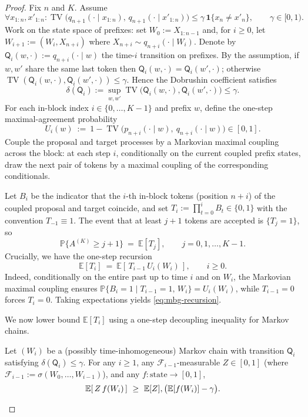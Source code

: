 \begin{proof}
Fix $n$ and $K$. Assume
\[
\forall x_{1:n},x'_{1:n}:\operatorname{TV}\big(q_{n+1}(\cdot\mid x_{1:n}),\,q_{n+1}(\cdot\mid x'_{1:n})\big)\le \gamma\,\mathbf{1}\{x_n\ne x'_n\},\qquad \gamma\in[0,1).
\]
Work on the state space of prefixes: set $W_0:=X_{1:n-1}$ and, for $i\ge0$, let $W_{i+1}:=(W_i,X_{n+i})$ where $X_{n+i}\sim q_{n+i}(\cdot\mid W_i)$. Denote by $\mathsf Q_i(w,\cdot):=q_{n+i}(\cdot\mid w)$ the time-$i$ transition on prefixes. By the assumption, if $w,w'$ share the same last token then $\mathsf Q_i(w,\cdot)=\mathsf Q_i(w',\cdot)$; otherwise $\operatorname{TV}(\mathsf Q_i(w,\cdot),\mathsf Q_i(w',\cdot))\le\gamma$. Hence the Dobrushin coefficient satisfies
\[
\delta(\mathsf Q_i):=\sup_{w,w'}\operatorname{TV}\big(\mathsf Q_i(w,\cdot),\mathsf Q_i(w',\cdot)\big)\le\gamma.
\]
For each in-block index $i\in\{0,\dots,K-1\}$ and prefix $w$, define the one-step maximal-agreement probability
\[
U_i(w)\ :=\ 1-\operatorname{TV}\big(p_{n+i}(\cdot\mid w),\ q_{n+i}(\cdot\mid w)\big)\in[0,1].
\]
Couple the proposal and target processes by a Markovian maximal coupling across the block: at each step $i$, conditionally on the current coupled prefix states, draw the next pair of tokens by a maximal coupling of the corresponding conditionals.

Let $B_i$ be the indicator that the $i$-th in-block tokens (position $n+i$) of the coupled proposal and target coincide, and set $T_i:=\prod_{t=0}^{i} B_t\in\{0,1\}$ with the convention $T_{-1}\equiv 1$. The event that at least $j{+}1$ tokens are accepted is $\{T_j=1\}$, so
\[
\mathbb{P}\{A^{(K)}\ge j{+}1\}\ =\ \mathbb{E}[T_j],\qquad j=0,1,\dots,K-1.
\]
Crucially, we have the one-step recursion
\begin{equation}\label{eq:mbg-recursion}
\mathbb{E}[T_i]\ =\ \mathbb{E}[\,T_{i-1}\,U_i(W_i)\,],\qquad i\ge0.
\end{equation}
Indeed, conditionally on the entire past up to time $i$ and on $W_i$, the Markovian maximal coupling ensures $\mathbb{P}\{B_i=1\mid T_{i-1}=1,\,W_i\}=U_i(W_i)$, while $T_{i-1}=0$ forces $T_i=0$. Taking expectations yields \eqref{eq:mbg-recursion}.

We now lower bound $\mathbb{E}[T_i]$ using a one-step decoupling inequality for Markov chains.

\begin{lemma}
Let $(W_i)$ be a (possibly time-inhomogeneous) Markov chain with transition $\mathsf Q_i$ satisfying $\delta(\mathsf Q_i)\le\gamma$. For any $i\ge1$, any $\mathcal F_{i-1}$-measurable $Z\in[0,1]$ (where $\mathcal F_{i-1}:=\sigma(W_0,\dots,W_{i-1})$), and any $f:\text{state}\to[0,1]$,
\begin{equation}\label{eq:mbg-decouple}
\mathbb{E}[\,Z\,f(W_i)\,]\ \ge\ \mathbb{E}[Z]\\,\big(\mathbb{E}[f(W_i)]-\gamma\big).
\end{equation}
\end{lemma}


\end{proof}

